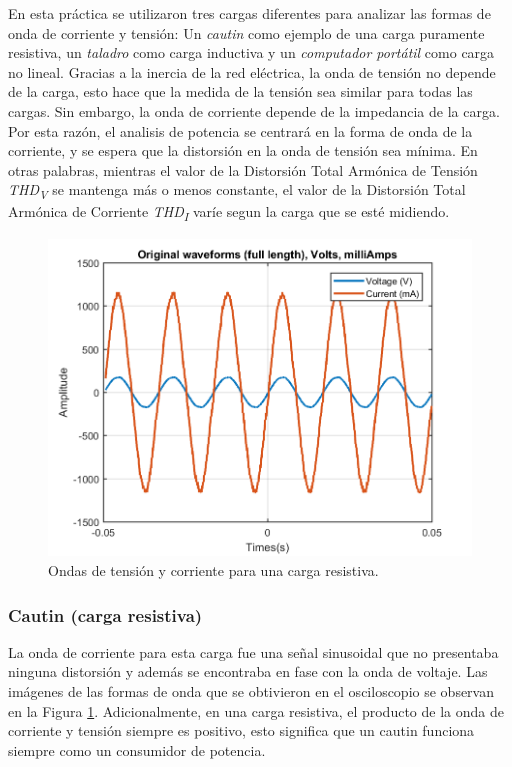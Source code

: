 \documentclass[journal]{IEEEtran}
\begin{document}
En esta práctica se utilizaron tres cargas diferentes 
para analizar las formas de onda de corriente y tensión: 
Un \textit{cautin} como ejemplo de una carga puramente 
resistiva, un \textit{taladro} como carga inductiva y un 
\textit{computador portátil} como carga no lineal. 
Gracias a la inercia de la red eléctrica, la onda de 
tensión no depende de la carga, esto hace que la medida de 
la tensión sea similar para todas las cargas. Sin embargo, 
la onda de corriente depende de la impedancia de la carga. 
Por esta razón, el analisis de potencia se centrará 
en la forma de onda de la corriente, y se espera que 
la distorsión en la onda de tensión sea mínima. En otras 
palabras, mientras el valor de la Distorsión Total Armónica
de Tensión \textit{THD\textsubscript{V}} se mantenga más o
menos constante, el valor de la Distorsión Total Armónica
de Corriente \textit{THD\textsubscript{I}} varíe segun 
la carga que se esté midiendo.  \\

\begin{figure}[h]
\centering
\includegraphics[clip,width=0.9\columnwidth]{original_waveform_cautin.png}
\caption{Ondas de tensión y corriente para una carga
resistiva.}
\label{original_resistive_load}
\end{figure}

\subsubsection{Cautin (carga resistiva)}
La onda de corriente para esta carga fue una señal 
sinusoidal que no presentaba ninguna distorsión y además 
se encontraba en fase con la onda de voltaje. Las imágenes
de las formas de onda que se obtivieron en el osciloscopio 
se observan en la Figura \ref{original_resistive_load}. 
Adicionalmente, en una carga resistiva, el producto de la 
onda de corriente y tensión siempre es positivo, esto 
significa que un cautin funciona siempre como un 
consumidor de potencia. \\
\end{document}
